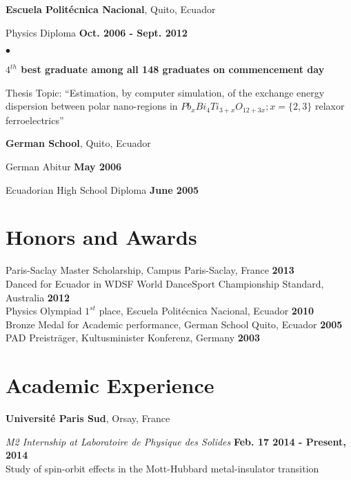 \documentclass[margin,line]{res}
\newenvironment{list1}{
  \begin{list}{\ding{113}}{%
      \setlength{\itemsep}{0in}
      \setlength{\parsep}{0in} \setlength{\parskip}{0in}
      \setlength{\topsep}{0in} \setlength{\partopsep}{0in} 
      \setlength{\leftmargin}{0.17in}}}{\end{list}}
\newenvironment{list2}{
  \begin{list}{$\bullet$}{%
      \setlength{\itemsep}{0in}
      \setlength{\parsep}{0in} \setlength{\parskip}{0in}
      \setlength{\topsep}{0in} \setlength{\partopsep}{0in} 
      \setlength{\leftmargin}{0.2in}}}{\end{list}}
\begin{document}
\begin{resume}
  {\bf Escuela Politécnica Nacional}, Quito, Ecuador\\
  \vspace{-.1in}
  \begin{list1}
    \item[] Physics Diploma \hfill {\bf Oct. 2006 - Sept. 2012}\\
    \begin{list2}
    \vspace{-.1in}
      \item[] {\bf $4^{th}$ best graduate among all 148 graduates on
      commencement day}
      \item Thesis Topic:  ``Estimation, by computer simulation, of the exchange
	energy dispersion between polar nano-regions in $Pb_xBi_4Ti_{3+x}O_{12+3x}; x=\{2,3\}$
	relaxor ferroelectrics''
    \end{list2}
  \end{list1}

  {\bf German School}, Quito, Ecuador\\
  \vspace{-.1in}
  \begin{list1}
    \item[] German Abitur \hfill {\bf May 2006}
    \item[] Ecuadorian High School Diploma \hfill {\bf June 2005}
  \end{list1}

\section{\sc Honors and Awards}
  Paris-Saclay Master Scholarship, Campus Paris-Saclay, France \hfill {\bf
2013}\\
  Danced for Ecuador in WDSF World DanceSport Championship Standard, Australia \hfill {\bf 2012}\\
  Physics Olympiad $1^{st}$ place, Escuela Politécnica Nacional, Ecuador \hfill {\bf 2010}\\
  Bronze Medal for Academic performance, German School Quito, Ecuador \hfill {\bf 2005}\\
  PAD Preisträger, Kultusminister Konferenz, Germany \hfill {\bf 2003}

\section{\sc Academic Experience}
  {\bf Université Paris Sud}, Orsay, France
  \begin{list1}
    \item[] {\em M2 Internship at Laboratoire de Physique des Solides} 
\hfill {\bf Feb. 17 2014 - Present, 2014}\\
Study of spin-orbit effects in the Mott-Hubbard metal-insulator transition
  \end{list1}
  

\end{resume}
\end{document}
